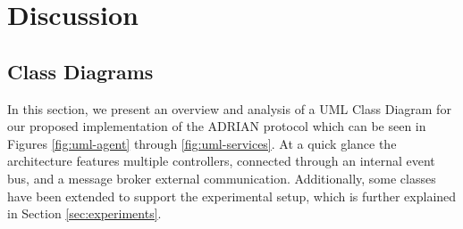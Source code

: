 \section{Discussion}
\label{sec:discussion}

\subsection{Class Diagrams}
\label{ssec:class-diagrams}


In this section, we present an overview and analysis of a UML Class Diagram for our proposed implementation of the ADRIAN protocol\cite{mann2023ADRIAN} which can be seen in Figures \ref{fig:uml-agent} through \ref{fig:uml-services}. At a quick glance the architecture features multiple controllers, connected through an internal event bus, and a message broker external communication. Additionally, some classes have been extended to support the experimental setup, which is further explained in Section \ref{sec:experiments}.

